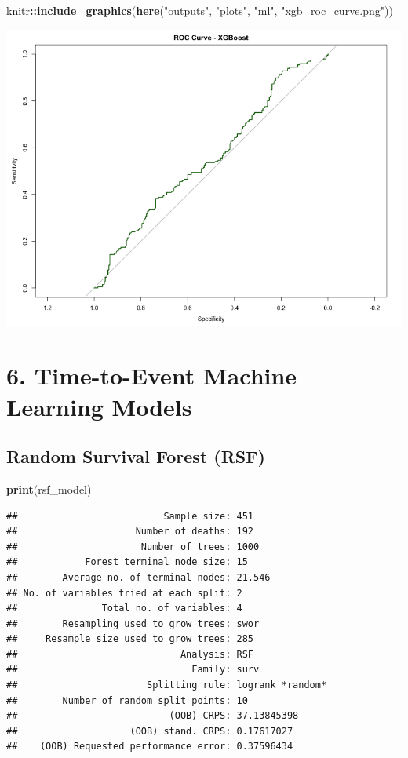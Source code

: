 \documentclass[
  11pt,
]{article}
\newenvironment{Shaded}{\begin{snugshade}}{\end{snugshade}}
\newcommand{\FunctionTok}[1]{\textcolor[rgb]{0.13,0.29,0.53}{\textbf{#1}}}
\newcommand{\NormalTok}[1]{#1}
\newcommand{\SpecialCharTok}[1]{\textcolor[rgb]{0.81,0.36,0.00}{\textbf{#1}}}
\newcommand{\StringTok}[1]{\textcolor[rgb]{0.31,0.60,0.02}{#1}}
\begin{document}
\begin{Shaded}
\begin{Highlighting}[]
\NormalTok{knitr}\SpecialCharTok{::}\FunctionTok{include\_graphics}\NormalTok{(}\FunctionTok{here}\NormalTok{(}\StringTok{"outputs"}\NormalTok{, }\StringTok{"plots"}\NormalTok{, }\StringTok{"ml"}\NormalTok{, }\StringTok{"xgb\_roc\_curve.png"}\NormalTok{))}
\end{Highlighting}
\end{Shaded}

\includegraphics[width=0.8\linewidth]{../outputs/plots/ml/xgb_roc_curve}

\section{6. Time-to-Event Machine Learning
Models}\label{time-to-event-machine-learning-models}

\subsection{Random Survival Forest
(RSF)}\label{random-survival-forest-rsf}

\begin{Shaded}
\begin{Highlighting}[]
\FunctionTok{print}\NormalTok{(rsf\_model)}
\end{Highlighting}
\end{Shaded}

\begin{verbatim}
##                          Sample size: 451
##                     Number of deaths: 192
##                      Number of trees: 1000
##            Forest terminal node size: 15
##        Average no. of terminal nodes: 21.546
## No. of variables tried at each split: 2
##               Total no. of variables: 4
##        Resampling used to grow trees: swor
##     Resample size used to grow trees: 285
##                             Analysis: RSF
##                               Family: surv
##                       Splitting rule: logrank *random*
##        Number of random split points: 10
##                           (OOB) CRPS: 37.13845398
##                    (OOB) stand. CRPS: 0.17617027
##    (OOB) Requested performance error: 0.37596434
\end{verbatim}
\end{document}
